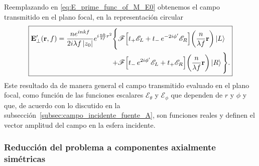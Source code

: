 Reemplazando en \eqref{eq:E_prime_func_of_M_E0} obtenemos el campo transmitido en el plano focal,
en la representación circular
\begin{equation}
\boxed{
\begin{aligned}
\vb{E}'_\perp(\vb r, f)
=
\frac{n e^{inkf}}{2i\lambda f\,|z_0|}
e^{i\frac{nk}{2f}r^2}
\Bigg\{
& \mathscr F\!\left[
t_+\mathscr E_L
+
t_-\,e^{-2i\phi'}\mathscr E_R
\right]
\!\left(
\frac{n}{\lambda f}\vb r
\right)
\ket{L}
\\
\qquad\qquad
+
& \mathscr F\!\left[
t_-\,e^{2i\phi'}\mathscr E_L
+
t_+\mathscr E_R
\right]
\!\left(
\frac{n}{\lambda f}\vb r
\right)
\ket{R}
\Bigg\}.
\end{aligned}
}
\label{eq:E_prime_in_circular_representation}
\end{equation}
Este resultado da de manera general el campo transmitido evaluado en el plano focal, como función de las funciones escalares $\mathscr E_\theta$ y $\mathscr E_\phi$ que dependen de $r$ y $\phi$ y que, de acuerdo con lo discutido en la subsección~\ref{subsec:campo_incidente_fuente_A}, son funciones reales y definen el vector amplitud del campo en la esfera incidente.

\subsubsection{Reducción del problema a componentes axialmente simétricas}

